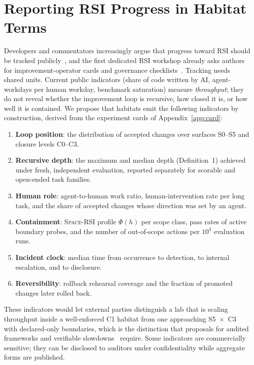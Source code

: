 \documentclass[11pt,a4paper]{article}
\newcommand{\spacersi}{\textsc{Space-RSI}}
\begin{document}
\section{Reporting RSI Progress in Habitat Terms}\label{sec:reporting}
Developers and commentators increasingly argue that progress toward RSI should be tracked publicly~\cite{openai2026accel,anthropic2026rsi}, and the first dedicated RSI workshop already asks authors for improvement-operator cards and governance checklists~\cite{iclr2026rsi}. Tracking needs shared units. Current public indicators (share of code written by AI, agent-workdays per human workday, benchmark saturation) measure \emph{throughput}; they do not reveal whether the improvement loop is recursive, how closed it is, or how well it is contained. We propose that habitats emit the following indicators by construction, derived from the experiment cards of Appendix~\ref{app:card}:
\begin{enumerate}[label=(R\arabic*)]
\item \textbf{Loop position}: the distribution of accepted changes over surfaces S0--S5 and closure levels C0--C3.
\item \textbf{Recursive depth}: the maximum and median depth (Definition~1) achieved under fresh, independent evaluation, reported separately for scorable and open-ended task families.
\item \textbf{Human role}: agent-to-human work ratio, human-intervention rate per long task, and the share of accepted changes whose direction was set by an agent.
\item \textbf{Containment}: \spacersi{} profile $\Phi(h)$ per scope class, pass rates of active boundary probes, and the number of out-of-scope actions per $10^4$ evaluation runs.
\item \textbf{Incident clock}: median time from occurrence to detection, to internal escalation, and to disclosure.
\item \textbf{Reversibility}: rollback rehearsal coverage and the fraction of promoted changes later rolled back.
\end{enumerate}
These indicators would let external parties distinguish a lab that is scaling throughput inside a well-enforced C1 habitat from one approaching S5~$\times$~C3 with declared-only boundaries, which is the distinction that proposals for audited frameworks and verifiable slowdowns~\cite{pachocki2026alien,anthropic2026rsi} require. Some indicators are commercially sensitive; they can be disclosed to auditors under confidentiality while aggregate forms are published.
\end{document}
